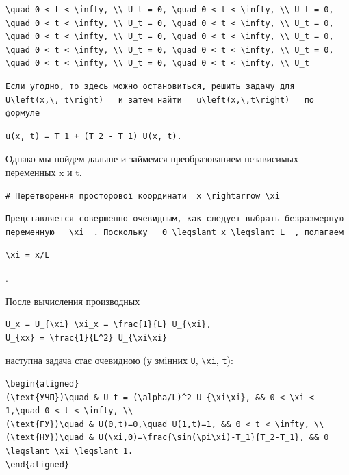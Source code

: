 \documentclass[
  ukrainian,
]{article}
\begin{document}
\begin{verbatim}
\quad 0 < t < \infty, \\ U_t = 0, \quad 0 < t < \infty, \\ U_t = 0, \quad 0 < t < \infty, \\ U_t = 0, \quad 0 < t < \infty, \\ U_t = 0, \quad 0 < t < \infty, \\ U_t = 0, \quad 0 < t < \infty, \\ U_t = 0, \quad 0 < t < \infty, \\ U_t = 0, \quad 0 < t < \infty, \\ U_t = 0, \quad 0 < t < \infty, \\ U_t = 0, \quad 0 < t < \infty, \\ U_t
\end{verbatim}

\begin{verbatim}
Если угодно, то здесь можно остановиться, решить задачу для   U\left(x,\, t\right)   и затем найти   u\left(x,\,t\right)   по формуле
\end{verbatim}

\begin{verbatim}
u(x, t) = T_1 + (T_2 - T_1) U(x, t).
\end{verbatim}

Однако мы пойдем дальше и займемся преобразованием независимых
переменных x и t.

\begin{verbatim}
# Перетворення просторової координати  x \rightarrow \xi
\end{verbatim}

\begin{verbatim}
Представляется совершенно очевидным, как следует выбрать безразмерную переменную   \xi  . Поскольку   0 \leqslant x \leqslant L  , полагаем
\end{verbatim}

\begin{verbatim}
\xi = x/L
\end{verbatim}

.

После вычисления производных

\begin{verbatim}
U_x = U_{\xi} \xi_x = \frac{1}{L} U_{\xi},
U_{xx} = \frac{1}{L^2} U_{\xi\xi}
\end{verbatim}

наступна задача стає очевидною (у змінних \texttt{U},
\texttt{\textbackslash{}xi}, \texttt{t}):

\begin{verbatim}
\begin{aligned}
(\text{УЧП})\quad & U_t = (\alpha/L)^2 U_{\xi\xi}, && 0 < \xi < 1,\quad 0 < t < \infty, \\
(\text{ГУ})\quad & U(0,t)=0,\quad U(1,t)=1, && 0 < t < \infty, \\
(\text{НУ})\quad & U(\xi,0)=\frac{\sin(\pi\xi)-T_1}{T_2-T_1}, && 0 \leqslant \xi \leqslant 1.
\end{aligned}
\end{verbatim}
\end{document}
